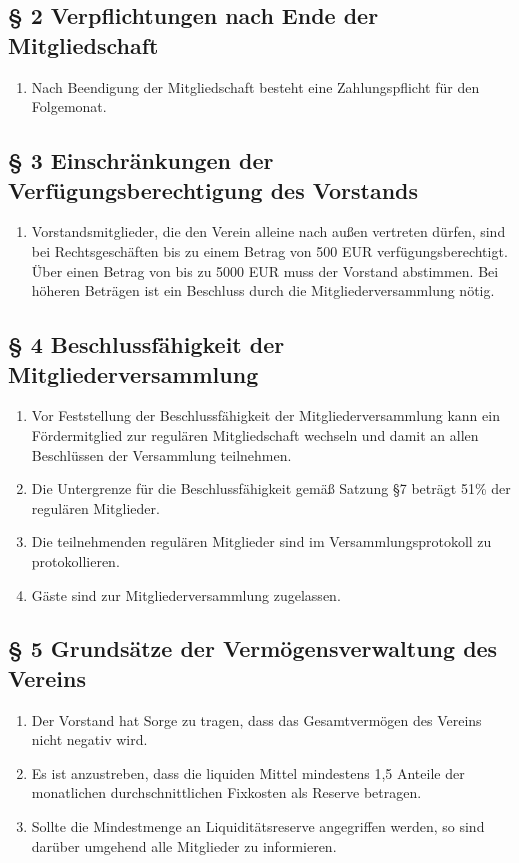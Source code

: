 \documentclass[10pt,a4paper]{article}
\begin{document}
%
%
\subsection*{§ 2 Verpflichtungen nach Ende der Mitgliedschaft}
\begin{enumerate}
\item Nach Beendigung der Mitgliedschaft besteht eine Zahlungspflicht für den Folgemonat.
\end{enumerate}
%
%
\subsection*{§ 3 Einschränkungen der Verfügungsberechtigung des Vorstands}
\begin{enumerate}
\item Vorstandsmitglieder, die den Verein alleine nach außen vertreten
    dürfen, sind bei Rechtsgeschäften bis zu einem Betrag von 500 EUR
    verfügungsberechtigt. Über einen Betrag von bis zu 5000 EUR muss der
    Vorstand abstimmen. Bei höheren Beträgen ist ein Beschluss durch die
    Mitgliederversammlung nötig.
\end{enumerate}
%
%
\subsection*{§ 4 Beschlussfähigkeit der Mitgliederversammlung}
\begin{enumerate}
\item Vor Feststellung der Beschlussfähigkeit der Mitgliederversammlung kann ein Fördermitglied zur regulären Mitgliedschaft wechseln und damit an allen Beschlüssen der Versammlung teilnehmen.
\item Die Untergrenze für die Beschlussfähigkeit gemäß Satzung §7 beträgt 51\% der regulären Mitglieder.
\item Die teilnehmenden regulären Mitglieder sind im Versammlungsprotokoll zu protokollieren.
\item Gäste sind zur Mitgliederversammlung zugelassen.
\end{enumerate}
%
%
\subsection*{§ 5 Grundsätze der Vermögensverwaltung des Vereins}
\begin{enumerate}
\item Der Vorstand hat Sorge zu tragen, dass das Gesamtvermögen des Vereins nicht negativ wird.
\item Es ist anzustreben, dass die liquiden Mittel mindestens 1,5 Anteile der monatlichen durchschnittlichen Fixkosten als Reserve betragen.
\item Sollte die Mindestmenge an Liquiditätsreserve angegriffen werden, so sind darüber umgehend alle Mitglieder zu informieren.
\end{enumerate}
\end{document}
